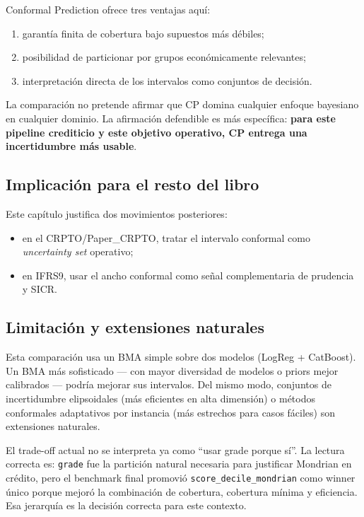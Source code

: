 \documentclass[
  spanish,
  11pt,
  letterpaper,
]{scrbook}
\providecommand{\tightlist}{%
  \setlength{\itemsep}{0pt}\setlength{\parskip}{0pt}}
\theoremstyle{plain}
\theoremstyle{remark}
\begin{document}
Conformal Prediction ofrece tres ventajas aquí:

\begin{enumerate}
\def\labelenumi{\arabic{enumi}.}
\tightlist
\item
  garantía finita de cobertura bajo supuestos más débiles;
\item
  posibilidad de particionar por grupos económicamente relevantes;
\item
  interpretación directa de los intervalos como conjuntos de decisión.
\end{enumerate}

La comparación no pretende afirmar que CP domina cualquier enfoque
bayesiano en cualquier dominio. La afirmación defendible es más
específica: \textbf{para este pipeline crediticio y este objetivo
operativo, CP entrega una incertidumbre más usable}.

\subsection{Implicación para el resto del
libro}\label{implicaciuxf3n-para-el-resto-del-libro}

Este capítulo justifica dos movimientos posteriores:

\begin{itemize}
\tightlist
\item
  en el CRPTO/Paper\_CRPTO, tratar el intervalo conformal como
  \emph{uncertainty set} operativo;
\item
  en IFRS9, usar el ancho conformal como señal complementaria de
  prudencia y SICR.
\end{itemize}

\subsection{Limitación y extensiones
naturales}\label{limitaciuxf3n-y-extensiones-naturales}

Esta comparación usa un BMA simple sobre dos modelos (LogReg +
CatBoost). Un BMA más sofisticado --- con mayor diversidad de modelos o
priors mejor calibrados --- podría mejorar sus intervalos. Del mismo
modo, conjuntos de incertidumbre elipsoidales (más eficientes en alta
dimensión) o métodos conformales adaptativos por instancia (más
estrechos para casos fáciles) son extensiones naturales.

El trade-off actual no se interpreta ya como ``usar grade porque sí''.
La lectura correcta es: \texttt{grade} fue la partición natural
necesaria para justificar Mondrian en crédito, pero el benchmark final
promovió \texttt{score\_decile\_mondrian} como winner único porque
mejoró la combinación de cobertura, cobertura mínima y eficiencia. Esa
jerarquía es la decisión correcta para este contexto.
\end{document}
